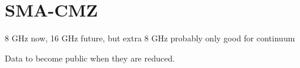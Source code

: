 \section{SMA-CMZ}
8 GHz now, 16 GHz future, but extra 8 GHz probably only good for continuum

Data to become public when they are reduced.
